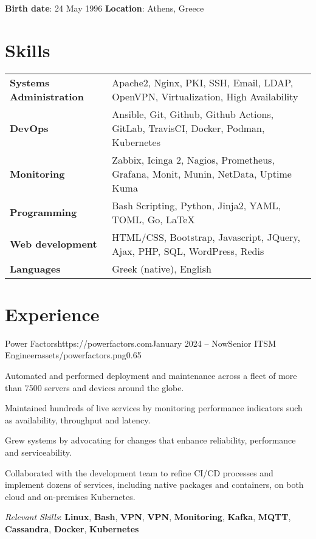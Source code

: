 \documentclass{mycv}
\begin{document}
	\pagestyle{empty}
	\begin{center}
		\textbf{Birth date}: 24 May 1996 {\Large\textperiodcentered} \textbf{Location}: Athens, Greece
	\end{center}
	
	\section{Skills}
	\begin{tabular}{m{4.5cm} m{12.5cm}}
	\textbf{Systems Administration}	& Apache2, Nginx, PKI, SSH, Email, LDAP, OpenVPN, Virtualization, High Availability \\
	\textbf{DevOps}	                & Ansible, Git, Github, Github Actions, GitLab, TravisCI, Docker, Podman, Kubernetes \\
	\textbf{Monitoring}             & Zabbix, Icinga 2, Nagios, Prometheus, Grafana, Monit, Munin, NetData, Uptime Kuma \\
	\textbf{Programming} 	 	   	& Bash Scripting, Python, Jinja2, YAML, TOML, Go, \LaTeX \\
	\textbf{Web development}	   	& HTML/CSS, Bootstrap, Javascript, JQuery, Ajax, PHP, SQL, WordPress, Redis \\
	\textbf{Languages} 			   	& Greek (native), English 
	\end{tabular}

	\section{Experience}

	\begin{EntryDatedLogo}{Power Factors}{https://powerfactors.com}{January 2024 -- Now}{Senior ITSM Engineer}{assets/powerfactors.png}{0.65}
		\begin{Itemize}
			\item Automated and performed deployment and maintenance across a fleet of more than 7500 servers and devices around the globe.
			\item Maintained hundreds of live services by monitoring performance indicators such as availability, throughput and latency.
			\item Grew systems by advocating for changes that enhance reliability, performance and serviceability.
			\item Collaborated with the development team to refine CI/CD processes and implement dozens of services, including native packages and containers, on both cloud and on-premises Kubernetes.
		\end{Itemize}
		\vspace{-0.3cm}
		\textit{Relevant Skills}: \textbf{Linux}, \textbf{Bash}, \textbf{VPN}, \textbf{VPN}, \textbf{Monitoring}, \textbf{Kafka}, \textbf{MQTT}, \textbf{Cassandra}, \textbf{Docker}, \textbf{Kubernetes}
	\end{EntryDatedLogo}
	
\end{document}

